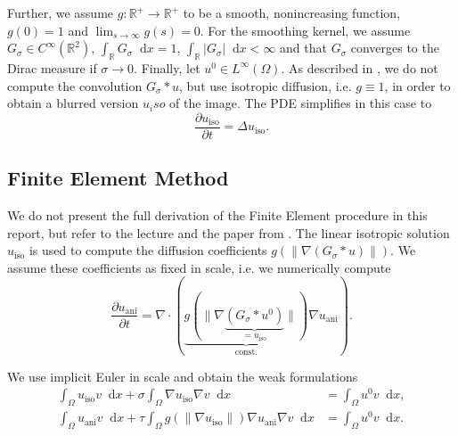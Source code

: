 \documentclass{report}
\renewcommand*\d{\mathop{}\!\mathrm{d}}
\def\R{\mathbb{R}}
\def\iso{\text{iso}}
\def\ani{\text{ani}}
\begin{document}
Further, we assume $g: \R^+ \rightarrow \R^+$ to be a smooth, nonincreasing function, $g(0)=1$ and $\lim_{s \rightarrow \infty} g(s) = 0$. For the smoothing kernel, we assume $G_\sigma \in C^\infty(\R^2)$, $\int_\R G_\sigma \d x = 1$, $\int_\R |G_\sigma| \d x < \infty$ and that $G_\sigma$ converges to the Dirac measure if $\sigma \to 0$. Finally, let $u^0 \in L^\infty(\Omega)$. As described in \cite{handlovicova2002}, we do not compute the convolution $G_{\sigma} \ast u$, but use isotropic diffusion, i.e. $g \equiv 1$, in order to obtain a blurred version $u_iso$ of the image. The PDE simplifies in this case to
\begin{equation} \label{pmiso}
	\frac{\partial u_\iso}{\partial t} = \Delta u_\iso.
\end{equation}

\subsection{Finite Element Method} 

We do not present the full derivation of the Finite Element procedure in this report, but refer to the lecture and the paper from \cite{handlovicova2002}. The linear isotropic solution $u_\iso$ is used to compute the diffusion coefficients $g\left(\left\|\nabla (G_{\sigma} \ast u)\right\|\right)$. We assume these coefficients as fixed in scale, i.e. we numerically compute
\begin{equation}
	\frac{\partial u_\ani}{\partial t} = \nabla \cdot (\underbrace{g(\|\nabla \underbrace{(G_{\sigma} \ast u^0)}_{=u_\iso}\|)}_\text{const.} \nabla u_\ani).
\end{equation}

We use implicit Euler in scale and obtain the weak formulations
\begin{align}
	\int_\Omega u_\iso v \d x + \sigma \int_\Omega \nabla u_\iso \nabla v \d x &= \int_\Omega u^0 v \d x, \\
	\int_\Omega u_\ani v \d x + \tau \int_\Omega g(\|\nabla u_\iso\|) \nabla u_\ani \nabla v \d x &= \int_\Omega u^0 v \d x.
\end{align}
\end{document}
